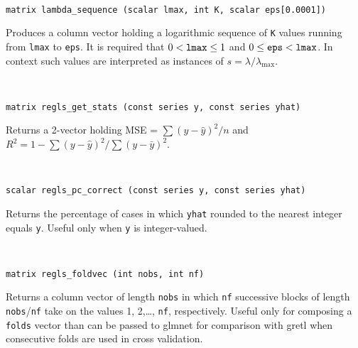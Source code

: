 \documentclass{article}
\newenvironment{funcdoc}
{\noindent\hrulefill\\[-12pt]}
{\medbreak}
\begin{document}
\begin{funcdoc}
\begin{verbatim}
matrix lambda_sequence (scalar lmax, int K, scalar eps[0.0001])
\end{verbatim}
  Produces a column vector holding a logarithmic sequence of
  \texttt{K} values running from \texttt{lmax} to \texttt{eps}. It is
  required that $0 < \mbox{\texttt{lmax}} \le 1$ and
  $0 \le \mbox{\texttt{eps}} < \mbox{\texttt{lmax}}$. In context such
  values are interpreted as instances of $s = \lambda/\lambda_{\max}$.
\end{funcdoc}


\begin{funcdoc}
\begin{verbatim}
matrix regls_get_stats (const series y, const series yhat)
\end{verbatim}
  Returns a 2-vector holding MSE = $\sum(y - \hat{y})^2/n$
  and $R^2 = 1 - \sum(y - \hat{y})^2/\sum(y - \bar{y})^2$.
\end{funcdoc}

\begin{funcdoc}
\begin{verbatim}
scalar regls_pc_correct (const series y, const series yhat)
\end{verbatim}
  Returns the percentage of cases in which \texttt{yhat} rounded to
  the nearest integer equals \texttt{y}. Useful only when \texttt{y}
  is integer-valued.
\end{funcdoc}

\begin{funcdoc}
\begin{verbatim}
matrix regls_foldvec (int nobs, int nf)
\end{verbatim}
  Returns a column vector of length \texttt{nobs} in which \texttt{nf}
  successive blocks of length \texttt{nobs}/\texttt{nf} take on the
  values 1, 2,\dots, \texttt{nf}, respectively. Useful only for
  composing a \texttt{folds} vector than can be passed to
  \textsf{glmnet} for comparison with gretl when consecutive folds are
  used in cross validation.
\end{funcdoc}
\end{document}
